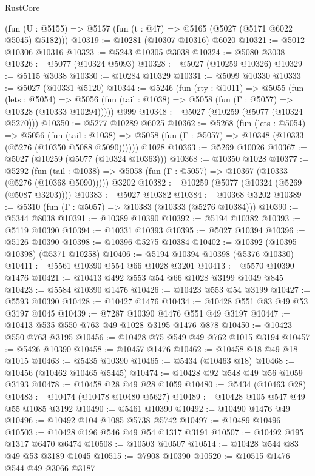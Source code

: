 \begin{lexlean}{RustCore}
\begin{coremodule}
    (fun (U : @5155) => @5157 (fun (t : @47) => @5165 (@5027 (@5171 @6022 @5045) @5182)))
@10319 := @10281 (@10307 @10316) @6020
@10321 := @5012 @10306 @10316
@10323 := @5243 @10305 @3038
@10324 := @5080 @3038
@10326 := @5077 (@10324 @5093)
@10328 := @5027 (@10259 @10326)
@10329 := @5115 @3038
@10330 := @10284 @10329
@10331 := @5099 @10330
@10333 := @5027 (@10331 @5120)
@10344 := @5246
    (fun (rty : @1011) =>
    @5055
      (fun (lets : @5054) =>
      @5056 (fun (tail : @1038) => @5058 (fun (Γ : @5057) => @10328 (@10333 @10294)))))
    @999
@10348 := @5027 (@10259 (@5077 (@10324 @5270)))
@10350 := @5277 @10289 @6025
@10362 := @5268
    (fun (lets : @5054) =>
    @5056
      (fun (tail : @1038) =>
      @5058 (fun (Γ : @5057) => @10348 (@10333 (@5276 (@10350 @5088 @5090))))))
    @1028
@10363 := @5269 @10026
@10367 := @5027 (@10259 (@5077 (@10324 @10363)))
@10368 := @10350 @1028
@10377 := @5292
    (fun (tail : @1038) => @5058 (fun (Γ : @5057) => @10367 (@10333 (@5276 (@10368 @5090)))))
    @3202
@10382 := @10259 (@5077 (@10324 (@5269 (@5087 @3203))))
@10383 := @5027 @10382
@10384 := @10368 @3202
@10389 := @5310 (fun (Γ : @5057) => @10383 (@10333 (@5276 @10384)))
@10390 := @5344 @8038
@10391 := @10389 @10390
@10392 := @5194 @10382
@10393 := @5119 @10390
@10394 := @10331 @10393
@10395 := @5027 @10394
@10396 := @5126 @10390
@10398 := @10396 @5275 @10384
@10402 := @10392 (@10395 @10398) (@5371 @10258)
@10406 := @5194 @10394 @10398 (@5376 @10330)
@10411 := @5561 @10390 @554 @66 @1028 @3201
@10413 := @5570 @10390 @1476
@10421 := @10413 @492 @553 @54 @66 @1028 @3199 @1049 @845
@10423 := @5584 @10390 @1476
@10426 := @10423 @553 @54 @3199
@10427 := @5593 @10390
@10428 := @10427 @1476
@10434 := @10428 @551 @83 @49 @53 @3197 @1045
@10439 := @7287 @10390 @1476 @551 @49 @3197
@10447 := @10413 @535 @550 @763 @49 @1028 @3195 @1476 @878
@10450 := @10423 @550 @763 @3195
@10456 := @10428 @75 @549 @49 @762 @1015 @3194
@10457 := @5426 @10390
@10458 := @10457 @1476
@10462 := @10458 @18 @49 @18 @1015
@10463 := @5435 @10390
@10465 := @5434 (@10463 @18)
@10468 := @10456 (@10462 @10465 @5445)
@10474 := @10428 @92 @548 @49 @56 @1059 @3193
@10478 := @10458 @28 @49 @28 @1059
@10480 := @5434 (@10463 @28)
@10483 := @10474 (@10478 @10480 @5627)
@10489 := @10428 @105 @547 @49 @55 @1085 @3192
@10490 := @5461 @10390
@10492 := @10490 @1476 @49
@10496 := @10492 @104 @1085 @5738 @5742
@10497 := @10489 @10496
@10503 := @10428 @196 @546 @49 @54 @1317 @3191
@10507 := @10492 @195 @1317 @6470 @6474
@10508 := @10503 @10507
@10514 := @10428 @544 @83 @49 @53 @3189 @1045
@10515 := @7908 @10390
@10520 := @10515 @1476 @544 @49 @3066 @3187

\end{coremodule}
\end{lexlean}
